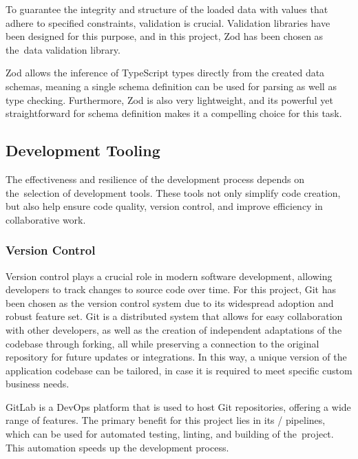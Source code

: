 To guarantee the integrity and structure of the loaded data with values that adhere to specified constraints, validation is crucial. Validation libraries have been designed for this purpose, and in this project, Zod has been chosen as the~data validation library.

Zod allows the inference of TypeScript types directly from the created data schemas, meaning a single schema definition can be used for parsing as well as type checking. Furthermore, Zod is also very lightweight, and its powerful yet straightforward  for schema definition makes it a compelling choice for this task.~\cite{Bhimani2023}


\subsection{Development Tooling}

The effectiveness and resilience of the development process depends on the~selection of development tools. These tools not only simplify code creation, but also help ensure code quality, version control, and improve efficiency in collaborative work.

\subsubsection{Version Control}

Version control plays a crucial role in modern software development, allowing developers to track changes to source code over time. For this project, Git has been chosen as the version control system due to its widespread adoption and robust feature set. Git is a distributed system that allows for easy collaboration with other developers, as well as the creation of independent adaptations of the codebase through forking, all while preserving a connection to the original repository for future updates or integrations. In this way, a unique version of the application codebase can be tailored, in case it is required to meet specific custom business needs.~\cite{Ponuthorai2022}

GitLab is a DevOps platform that is used to host Git repositories, offering a wide range of features. The primary benefit for this project lies in its / pipelines, which can be used for automated testing, linting, and building of the~project. This automation speeds up the development process.~\cite{GitLab}

